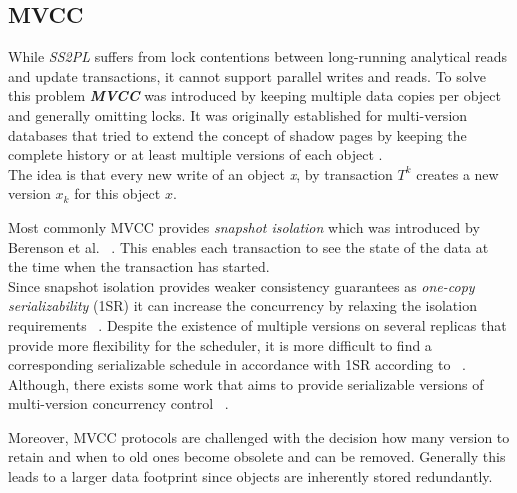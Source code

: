 \subsection{MVCC}
While \emph{SS2PL} suffers from lock contentions between long-running analytical reads and update transactions, it cannot support parallel writes and reads. 
To solve this problem \emph{\textbf{MVCC}} \cite{bernstein:1981} was introduced by keeping multiple data copies per object and generally omitting locks.
It was originally established for multi-version databases that tried to extend the concept of shadow pages by keeping the complete history or at least multiple versions 
of each object \cite{bernstein:1982, bernstein:1983}.\\
The idea is that every new write of an object \emph{x}, by transaction $T^k$ creates a new version $x_k$ for this object $x$.

Most commonly MVCC provides \emph{snapshot isolation} which was introduced by Berenson et al. ~\cite{berenson:1995}.
This enables each transaction to see the state of the data at the time when the transaction has started.\\

Since snapshot isolation provides weaker consistency guarantees as \emph{one-copy serializability} (1SR) it can increase the concurrency by relaxing 
the isolation requirements ~.
Despite the existence of multiple versions on several replicas that provide more flexibility for the scheduler, it 
is more difficult to find a corresponding serializable schedule in accordance with 1SR according to ~\cite{daudjee:2006}.\\
Although, there exists some work that aims to provide serializable versions of multi-version concurrency control ~\cite{fekete:2005, faleiro:2015}.

Moreover, MVCC protocols are challenged with the decision how many version to retain and when to old ones become obsolete and can be removed. 
Generally this leads to a larger data footprint since objects are inherently stored redundantly. 

